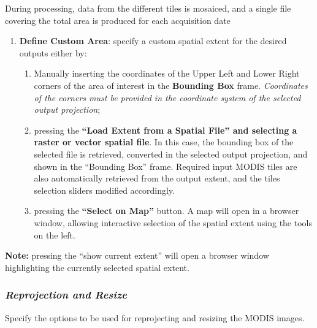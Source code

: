 \documentclass[]{article}
\begin{document}
During processing, data from the different tiles is mosaiced, and a
single file covering the total area is produced for each acquisition
date

\begin{enumerate}
\def\labelenumi{\arabic{enumi}.}
\setcounter{enumi}{1}
\item
  \textbf{Define Custom Area}: specify a custom spatial extent for the
  desired outputs either by:

  \begin{enumerate}
  \def\labelenumii{\alph{enumii}.}
  \item
    Manually inserting the coordinates of the Upper Left and Lower Right
    corners of the area of interest in the \textbf{Bounding Box} frame.
    \emph{Coordinates of the corners must be provided in the coordinate
    system of the selected output projection};
  \item
    pressing the \textbf{``Load Extent from a Spatial File'' and
    selecting a raster or vector spatial file}. In this case, the
    bounding box of the selected file is retrieved, converted in the
    selected output projection, and shown in the ``Bounding Box'' frame.
    Required input MODIS tiles are also automatically retrieved from the
    output extent, and the tiles selection sliders modified accordingly.
  \item
    pressing the \textbf{``Select on Map''} button. A map will open in a
    browser window, allowing interactive selection of the spatial extent
    using the tools on the left.
  \end{enumerate}
\end{enumerate}

\textbf{Note: } pressing the ``show current extent'' will open a browser
window highlighting the currently selected spatial extent.

\subsubsection{\texorpdfstring{\emph{Reprojection and
Resize}}{Reprojection and Resize}}\label{reprojection-and-resize}

Specify the options to be used for reprojecting and resizing the MODIS
images.
\end{document}
